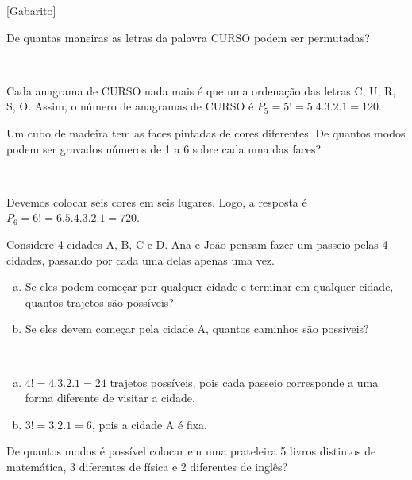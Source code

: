 \documentclass[a4paper, 12pt, addpoints]{exam}
\begin{document}
\info\vspace{-1 cm} %
[Gabarito]
\begin{questions}%
  \question De quantas maneiras as letras da palavra CURSO podem ser permutadas?
  
  \begin{resp}~

    Cada anagrama de CURSO nada mais é que uma ordenação das letras C, U, R, S, O. Assim, o número de anagramas de CURSO é $P_5 = 5! = 5 . 4 . 3 . 2 .  1 = 120$.
  \end{resp}

  \question Um cubo de madeira tem as faces pintadas de cores diferentes. De  quantos modos podem ser gravados números de 1 a 6 sobre cada uma das faces?

  \begin{resp}~

    Devemos colocar seis cores em seis lugares. Logo, a resposta é $P_6 = 6! = 6.5 . 4 . 3 . 2 . 1 = 720$.
  \end{resp}

  \question Considere 4 cidades A, B, C e D. Ana e João pensam fazer um passeio pelas 4 cidades, passando por cada uma delas apenas uma vez.

  \begin{enumerate}[a)]
    \item Se eles podem começar por qualquer cidade e terminar em qualquer cidade, quantos trajetos são possíveis?
    \item Se eles devem começar pela cidade A, quantos caminhos são possíveis? 
  \end{enumerate}

  \begin{resp}~

    \begin{enumerate}[a)]
      \item $4! = 4 . 3 . 2 . 1 = 24$ trajetos possíveis, pois cada passeio corresponde a uma forma diferente de visitar a cidade.
      \item $3! = 3 . 2 . 1 = 6$, pois a cidade A é fixa.
    \end{enumerate}
  \end{resp}
  
  
\question De quantos modos é possível colocar em uma prateleira 5 livros distintos de matemática, 3 diferentes de física e 2 diferentes de inglês?


\end{questions}
\end{document}
